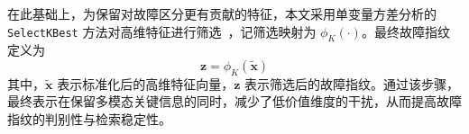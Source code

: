 在此基础上，为保留对故障区分更有贡献的特征，本文采用单变量方差分析的 \texttt{SelectKBest} 方法对高维特征进行筛选~\cite{scikit-learn,scipy}，记筛选映射为 $\phi_K(\cdot)$。最终故障指纹定义为
\begin{equation}
\mathbf{z} = \phi_K(\tilde{\mathbf{x}})
\end{equation}
其中，$\tilde{\mathbf{x}}$ 表示标准化后的高维特征向量，$\mathbf{z}$ 表示筛选后的故障指纹。通过该步骤，最终表示在保留多模态关键信息的同时，减少了低价值维度的干扰，从而提高故障指纹的判别性与检索稳定性。


\makeatletter
{}
\setlength{\@fptop}{0pt}
\makeatother
\renewcommand{\thealgorithm}{\thechapter-\arabic{algorithm}}

\algrenewcommand{}
\algrenewcommand{}
\algrenewcommand{}
\algrenewcommand{}
\algrenewcommand{}

